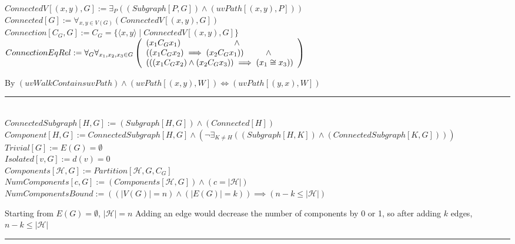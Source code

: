 \documentclass{book}
\newcommand{\abr}{:=}
\newcommand{\st}{\mathbin{|}}
\begin{document}
$ConnectedV[(x, y), G] \abr \exists_{P}((Subgraph[P, G]) \land (uvPath[(x, y), P]))$ \\
$Connected[G] \abr \forall_{x, y \in V(G)}(ConnectedV[(x, y), G])$ \\
$Connection[C_G, G] \abr C_G = \{\langle x, y \rangle \st ConnectedV[(x, y), G]\}$ \\

$ConnectionEqRel \abr \forall_{G} \forall_{x_1, x_2, x_3 \in G}
\left(\begin{array}{ll}
  (x_1 C_G x_1) \hfill \land \hfill \\
  ((x_1 C_G x_2) \implies (x_2 C_G x_1)) \hfill \land \hfill \\
  (((x_1 C_G x_2) \land (x_2 C_G x_3)) \implies (x_1 \cong x_3)) \\
\end{array}\right)$
\begin{enumerate}
  \lit By $(uvWalkContainsuvPath) \land (uvPath[(x, y), W]) \iff (uvPath[(y, x), W])$
\end{enumerate} \vspace{.75mm} \hrule \vspace{.75mm} \ \\

$ConnectedSubgraph[H, G] \abr (Subgraph[H, G]) \land (Connected[H])$ \\
$Component[H, G] \abr ConnectedSubgraph[H, G] \land (\lnot \exists_{K \neq H}((Subgraph[H, K]) \land (ConnectedSubgraph[K, G])))$ \\
$Trivial[G] \abr E(G) = \emptyset$ \\
$Isolated[v, G] \abr d(v) = 0$ \\

$Components[\mathcal{H}, G] \abr Partition[\mathcal{H}, G, C_G]$ \\
$NumComponents[c, G] \abr (Components[\mathcal{H}, G]) \land (c = |\mathcal{H}|)$ \\

$NumComponentsBound \abr ((|V(G)| = n) \land (|E(G)| = k)) \implies (n - k \leq |\mathcal{H}|)$ \\
\begin{enumerate}
  \lit Starting from $E(G) = \emptyset$, $|\mathcal{H}| = n$
  \lit Adding an edge would decrease the number of components by 0 or 1, so after adding $k$ edges, $n - k \leq |\mathcal{H}|$
\end{enumerate} \vspace{.75mm} \hrule \vspace{.75mm} \ \\
\end{document}

